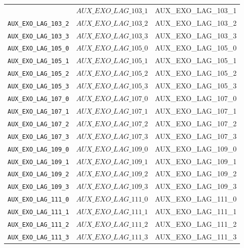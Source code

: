 \begin{center}
\begin{longtable}{ccc}
{\texttt{AUX\_EXO\_LAG\_103\_1} & $AUX\_EXO\_LAG\_103\_1$ & AUX\_EXO\_LAG\_103\_1\\
\texttt{AUX\_EXO\_LAG\_103\_2} & $AUX\_EXO\_LAG\_103\_2$ & AUX\_EXO\_LAG\_103\_2\\
\texttt{AUX\_EXO\_LAG\_103\_3} & $AUX\_EXO\_LAG\_103\_3$ & AUX\_EXO\_LAG\_103\_3\\
\texttt{AUX\_EXO\_LAG\_105\_0} & $AUX\_EXO\_LAG\_105\_0$ & AUX\_EXO\_LAG\_105\_0\\
\texttt{AUX\_EXO\_LAG\_105\_1} & $AUX\_EXO\_LAG\_105\_1$ & AUX\_EXO\_LAG\_105\_1\\
\texttt{AUX\_EXO\_LAG\_105\_2} & $AUX\_EXO\_LAG\_105\_2$ & AUX\_EXO\_LAG\_105\_2\\
\texttt{AUX\_EXO\_LAG\_105\_3} & $AUX\_EXO\_LAG\_105\_3$ & AUX\_EXO\_LAG\_105\_3\\
\texttt{AUX\_EXO\_LAG\_107\_0} & $AUX\_EXO\_LAG\_107\_0$ & AUX\_EXO\_LAG\_107\_0\\
\texttt{AUX\_EXO\_LAG\_107\_1} & $AUX\_EXO\_LAG\_107\_1$ & AUX\_EXO\_LAG\_107\_1\\
\texttt{AUX\_EXO\_LAG\_107\_2} & $AUX\_EXO\_LAG\_107\_2$ & AUX\_EXO\_LAG\_107\_2\\
\texttt{AUX\_EXO\_LAG\_107\_3} & $AUX\_EXO\_LAG\_107\_3$ & AUX\_EXO\_LAG\_107\_3\\
\texttt{AUX\_EXO\_LAG\_109\_0} & $AUX\_EXO\_LAG\_109\_0$ & AUX\_EXO\_LAG\_109\_0\\
\texttt{AUX\_EXO\_LAG\_109\_1} & $AUX\_EXO\_LAG\_109\_1$ & AUX\_EXO\_LAG\_109\_1\\
\texttt{AUX\_EXO\_LAG\_109\_2} & $AUX\_EXO\_LAG\_109\_2$ & AUX\_EXO\_LAG\_109\_2\\
\texttt{AUX\_EXO\_LAG\_109\_3} & $AUX\_EXO\_LAG\_109\_3$ & AUX\_EXO\_LAG\_109\_3\\
\texttt{AUX\_EXO\_LAG\_111\_0} & $AUX\_EXO\_LAG\_111\_0$ & AUX\_EXO\_LAG\_111\_0\\
\texttt{AUX\_EXO\_LAG\_111\_1} & $AUX\_EXO\_LAG\_111\_1$ & AUX\_EXO\_LAG\_111\_1\\
\texttt{AUX\_EXO\_LAG\_111\_2} & $AUX\_EXO\_LAG\_111\_2$ & AUX\_EXO\_LAG\_111\_2\\
\texttt{AUX\_EXO\_LAG\_111\_3} & $AUX\_EXO\_LAG\_111\_3$ & AUX\_EXO\_LAG\_111\_3\\
\hline%
\end{longtable}
\end{center}
